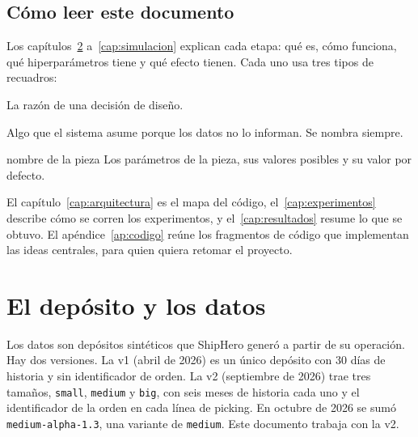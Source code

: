 \documentclass[11pt,a4paper,oneside]{report}
\newcommand{\code}[1]{\texttt{\small #1}}
\begin{document}
\section{Cómo leer este documento}

Los capítulos~\ref{cap:datos} a~\ref{cap:simulacion} explican cada etapa: qué es, cómo
funciona, qué hiperparámetros tiene y qué efecto tienen. Cada uno usa tres tipos de
recuadros:

\begin{idea}
La razón de una decisión de diseño.
\end{idea}
\begin{supuesto}
Algo que el sistema asume porque los datos no lo informan. Se nombra siempre.
\end{supuesto}
\begin{hiper}{nombre de la pieza}
Los parámetros de la pieza, sus valores posibles y su valor por defecto.
\end{hiper}

El capítulo~\ref{cap:arquitectura} es el mapa del código, el~\ref{cap:experimentos}
describe cómo se corren los experimentos, y el~\ref{cap:resultados} resume lo que se obtuvo.
El apéndice~\ref{ap:codigo} reúne los fragmentos de código que implementan las ideas
centrales, para quien quiera retomar el proyecto.

\chapter{El depósito y los datos}
\label{cap:datos}

Los datos son depósitos sintéticos que ShipHero generó a partir de su operación. Hay dos
versiones. La v1 (abril de 2026) es un único depósito con 30 días de historia y sin
identificador de orden. La v2 (septiembre de 2026) trae tres tamaños, \code{small},
\code{medium} y \code{big}, con seis meses de historia cada uno y el identificador de la orden
en cada línea de picking. En octubre de 2026 se sumó \code{medium-alpha-1.3}, una variante de
\code{medium}. Este documento trabaja con la v2.

\newcommand{\layout}{%
  \fill[gray!8] (0.3,-0.8) rectangle (8.1,-0.2);
  \fill[gray!8] (0.3,4.75) rectangle (8.1,5.35);
  \fill[gray!8] (0.3,1.98) rectangle (8.1,2.53);
  \foreach \a in {0,...,3} {
    \pgfmathsetmacro{\cx}{2.0*\a+1.2}
    \fill[gray!8] (\cx-0.3,-0.8) rectangle (\cx+0.3,5.35);
    \foreach \j in {0,...,9} {
      \pgfmathsetmacro{\yy}{0.4*\j + (\j>4)*0.55}
      \draw[gray!60, fill=white] (\cx-0.7,\yy) rectangle (\cx-0.32,\yy+0.36);
      \draw[gray!60, fill=white] (\cx+0.32,\yy) rectangle (\cx+0.7,\yy+0.36);
    }
    \pgfmathtruncatemacro{\num}{\a+1}
    \node[font=\scriptsize] at (\cx,5.6) {pasillo \num};
  }
  \node[dock] (dock) at (-0.4,-0.5) {dock};
}
\end{document}
